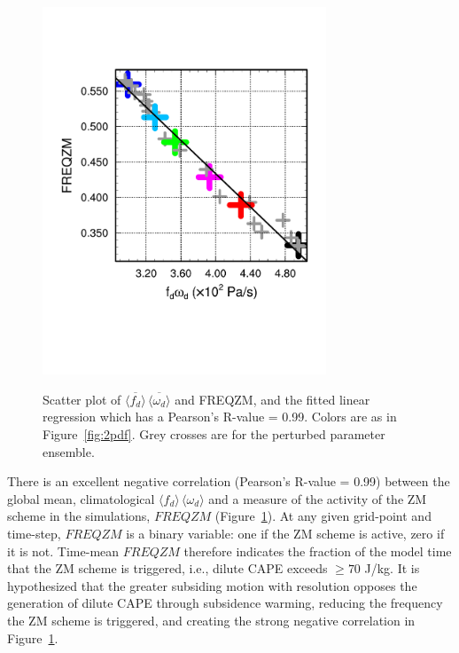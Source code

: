 \documentclass[times]{qjrms4}
\begin{document}
\begin{figure}[t]
\begin{center}
\noindent\includegraphics[width=20pc,angle=0]{figs/temp_diags_corr.pdf}\\
\end{center}
\caption{Scatter plot of $\overline{\langle f_{d} \rangle} \, \overline{\langle \omega_{d} \rangle}$ and FREQZM, and the fitted linear regression which has a Pearson's R-value = 0.99. Colors are as in Figure~\ref{fig:2pdf}. Grey crosses are for the perturbed parameter ensemble.}
\label{fig:corr}
\end{figure}

There is an excellent negative correlation (Pearson's R-value = 0.99) between the global mean, climatological $\langle f_{d} \rangle \, \langle \omega_{d} \rangle$ and a measure of the activity of the ZM scheme in the simulations, $FREQZM$ (Figure~\ref{fig:corr}). At any given grid-point and time-step, $FREQZM$ is a binary variable: one if the ZM scheme is active, zero if it is not. Time-mean $FREQZM$ therefore indicates the fraction of the model time that the ZM scheme is triggered, i.e., dilute CAPE exceeds $\geq 70$ J/kg. It is hypothesized that the greater subsiding motion with resolution opposes the generation of dilute CAPE through subsidence warming, reducing the frequency the ZM scheme is triggered, and creating the strong negative correlation in Figure~\ref{fig:corr}.
\end{document}
